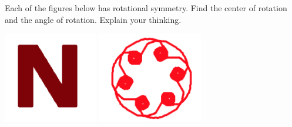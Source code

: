 \begin{problem}
Each of the figures below has rotational symmetry.  Find the center of rotation and the angle of rotation.  Explain your thinking.

\begin{center}
\includegraphics[height=4cm]{rotsym1}
\qquad\qquad
\includegraphics[height=4cm]{rotsym2}
\end{center}

\end{problem}

\bigskip


